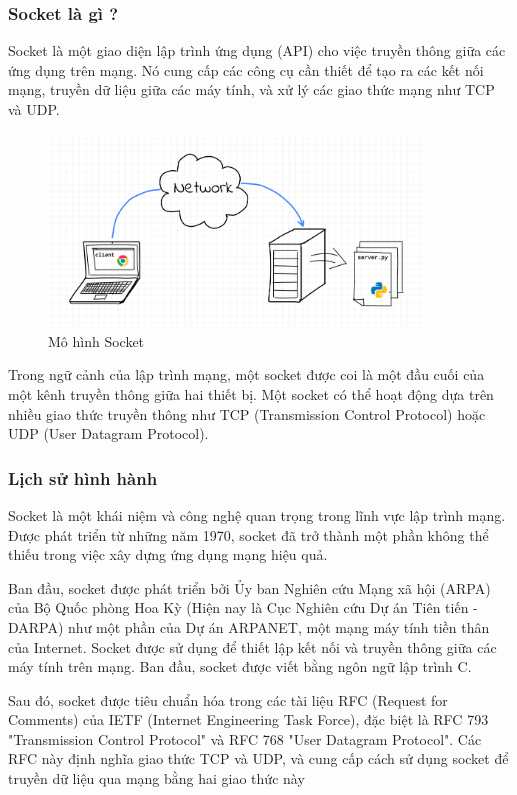 \documentclass[a4paper]{article}
\begin{document}
\subsubsection{Socket là gì ?}
\hspace{5mm}
Socket là một giao diện lập trình ứng dụng (API) cho việc truyền thông giữa các ứng dụng trên mạng. Nó cung cấp các công cụ cần thiết để tạo ra các kết nối mạng, truyền dữ liệu giữa các máy tính, và xử lý các giao thức mạng như TCP và UDP.
\begin{figure}[h!]
\begin{center}
\includegraphics[width=10cm]{image/socket.png}
\end{center}
\caption{Mô hình Socket}
\end{figure}

Trong ngữ cảnh của lập trình mạng, một socket được coi là một đầu cuối của một kênh truyền thông giữa hai thiết bị. Một socket có thể hoạt động dựa trên nhiều giao thức truyền thông như TCP (Transmission Control Protocol) hoặc UDP (User Datagram Protocol).

\subsubsection{Lịch sử hình hành}
\hspace{5mm}
Socket là một khái niệm và công nghệ quan trọng trong lĩnh vực lập trình mạng. Được phát triển từ những năm 1970, socket đã trở thành một phần không thể thiếu trong việc xây dựng ứng dụng mạng hiệu quả.

Ban đầu, socket được phát triển bởi Ủy ban Nghiên cứu Mạng xã hội (ARPA) của Bộ Quốc phòng Hoa Kỳ (Hiện nay là Cục Nghiên cứu Dự án Tiên tiến - DARPA) như một phần của Dự án ARPANET, một mạng máy tính tiền thân của Internet. Socket được sử dụng để thiết lập kết nối và truyền thông giữa các máy tính trên mạng. Ban đầu, socket được viết bằng ngôn ngữ lập trình C.

Sau đó, socket được tiêu chuẩn hóa trong các tài liệu RFC (Request for Comments) của IETF (Internet Engineering Task Force), đặc biệt là RFC 793 "Transmission Control Protocol" và RFC 768 "User Datagram Protocol". Các RFC này định nghĩa giao thức TCP và UDP, và cung cấp cách sử dụng socket để truyền dữ liệu qua mạng bằng hai giao thức này
\end{document}
